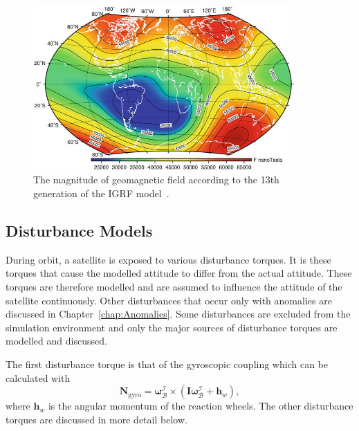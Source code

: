 \begin{figure}[!htb]
	\centering
	\includegraphics[width = 10cm]{Figures/IGRF-13th.png}
	\caption{The magnitude of geomagnetic field according to the 13th generation of the IGRF model~\cite{koskinen2022radiation}.}
	\label{fig:IGRF13th}
\end{figure}

\subsection{Disturbance Models}
\label{section: disturbance models}
During orbit, a satellite is exposed to various disturbance torques. It is these torques that cause the modelled attitude to differ from the actual attitude. These torques are therefore modelled and are assumed to influence the attitude of the satellite continuously. Other disturbances that occur only with anomalies are discussed in Chapter~\ref{chap:Anomalies}. Some disturbances are excluded from the simulation environment and only the major sources of disturbance torques are modelled and discussed.

The first disturbance torque is that of the gyroscopic coupling which can be calculated with
\begin{equation}
\mathbf{N}_{\text{gyro}} = \boldsymbol{\omega}_\mathcal{B}^\mathcal{I} \times (\mathbf{I}\boldsymbol{\omega}_\mathcal{B}^\mathcal{I} + \mathbf{h}_w),
\end{equation}
where $\mathbf{h}_w$ is the angular momentum of the reaction wheels. The other disturbance torques are discussed in more detail below.

